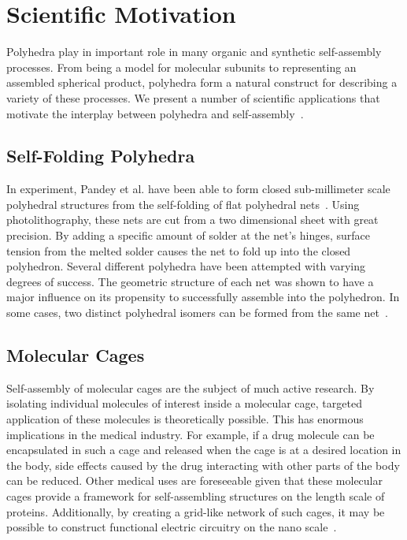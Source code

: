 \section{Scientific Motivation}

Polyhedra play in important role in many organic and synthetic self-assembly processes. From being a model for molecular subunits to representing an assembled spherical product, polyhedra form a natural construct for describing a variety of these processes. We present a number of scientific applications that motivate the interplay between polyhedra and self-assembly~\cite{Kaplan2014}.

\subsection{Self-Folding Polyhedra}
\label{ssc:SelfFold}
In experiment, Pandey et al. have been able to form closed sub-millimeter scale polyhedral structures from the self-folding of flat polyhedral nets~\cite{Pandey2011}. Using photolithography, these nets are cut from a two dimensional sheet with great precision. By adding a specific amount of solder at the net's hinges, surface tension from the melted solder causes the net to fold up into the closed polyhedron. Several different polyhedra have been attempted with varying degrees of success. The geometric structure of each net was shown to have a major influence on its propensity to successfully assemble into the polyhedron. In some cases, two distinct polyhedral isomers can be formed from the same net~\cite{Pandey2014}.

\subsection{Molecular Cages}

Self-assembly of molecular cages are the subject of much active research. By isolating individual molecules of interest inside a molecular cage, targeted application of these molecules is theoretically possible. This has enormous implications in the medical industry. For example, if a drug molecule can be encapsulated in such a cage and released when the cage is at a desired location in the body, side effects caused by the drug interacting with other parts of the body can be reduced. Other medical uses are foreseeable given that these molecular cages provide a framework for self-assembling structures on the length scale of proteins. Additionally, by creating a grid-like network of such cages, it may be possible to construct functional electric circuitry on the nano scale~\cite{Sun2010}. 


